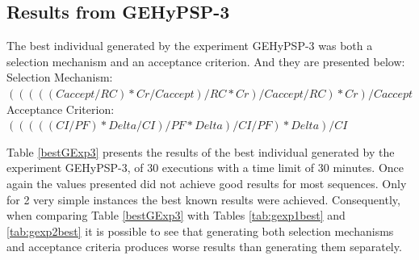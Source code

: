 \documentclass[conference]{IEEEtran}
\begin{document}
\begin{table}[]
	\centering
	\caption{Results from the best individual found in GEHyPSP-2
		}
	\label{tab:gexp2best}
\end{table}

\subsection{Results from GEHyPSP-3}

The best individual generated by the experiment GEHyPSP-3 was both a selection mechanism and an acceptance criterion. And they are presented below: \\ 
Selection Mechanism: $( ( ( ( ( Caccept / RC ) * Cr / Caccept ) / RC * Cr ) / Caccept / RC ) * Cr ) / Caccept$ \\
Acceptance Criterion: $( ( ( ( ( CI / PF ) * Delta / CI ) / PF * Delta ) / CI / PF ) * Delta ) / CI$

Table \ref{bestGExp3} presents the results of the best individual generated by the experiment GEHyPSP-3, of 30 executions with a time limit of 30 minutes. Once again the values presented did not achieve good results for most sequences. Only for 2 very simple instances the best known results were achieved. Consequently, when comparing Table \ref{bestGExp3} with Tables \ref{tab:gexp1best} and \ref{tab:gexp2best} it is possible to see that generating both selection mechanisms and acceptance criteria produces worse results than generating them separately.
\end{document}
